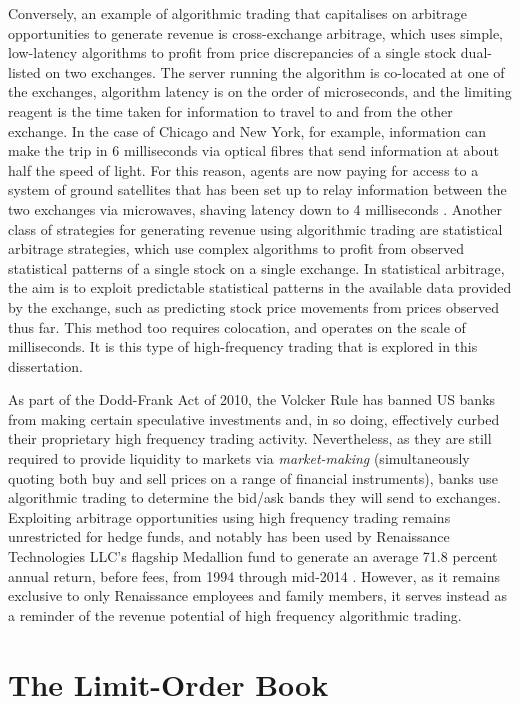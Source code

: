 Conversely, an example of algorithmic trading that capitalises on arbitrage opportunities to generate revenue is cross-exchange arbitrage, which uses simple, low-latency algorithms to profit from price discrepancies of a single stock dual-listed on two exchanges. The server running the algorithm is co-located at one of the exchanges, algorithm latency is on the order of microseconds, and the limiting reagent is the time taken for information to travel to and from the other exchange. In the case of Chicago and New York, for example, information can make the trip in 6 milliseconds via optical fibres that send information at about half the speed of light. For this reason, agents are now paying for access to a system of ground satellites that has been set up to relay information between the two exchanges via microwaves, shaving latency down to 4 milliseconds \citep{Laughlin14}. Another class of strategies for generating revenue using algorithmic trading are statistical arbitrage strategies, which use complex algorithms to profit from observed statistical patterns of a single stock on a single exchange. In statistical arbitrage, the aim is to exploit predictable statistical patterns in the available data provided by the exchange, such as predicting stock price movements from prices observed thus far. This method too requires colocation, and operates on the scale of milliseconds. It is this type of high-frequency trading that is explored in this dissertation. 

As part of the Dodd-Frank Act of 2010, the Volcker Rule has banned US banks from making certain speculative investments and, in so doing, effectively curbed their proprietary high frequency trading activity. Nevertheless, as they are still required to provide liquidity to markets via \emph{market-making} (simultaneously quoting both buy and sell prices on a range of financial instruments), banks use algorithmic trading to determine the bid/ask bands they will send to exchanges. Exploiting arbitrage opportunities using high frequency trading remains unrestricted for hedge funds, and notably has been used by Renaissance Technologies LLC's flagship Medallion fund to generate an average 71.8 percent annual return, before fees, from 1994 through mid-2014 \citep{rentech}. However, as it remains exclusive to only Renaissance employees and family members, it serves instead as a reminder of the revenue potential of high frequency algorithmic trading.

\section{The Limit-Order Book}


